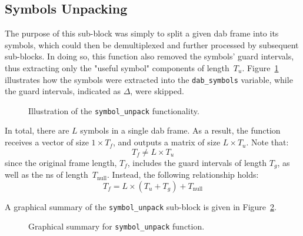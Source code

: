 \documentclass[class=report,11pt,crop=false]{standalone}
\begin{document}
\subsection{Symbols Unpacking \label{subsect:dab-proc_symbols-unpack}}
The purpose of this sub-block was simply to split a given \gls{dab} frame into its symbols, which could then be demultiplexed and further processed by subsequent sub-blocks. In doing so, this function also removed the symbols' guard intervals, thus extracting only the "useful symbol" components of length~\(T_u\). Figure~\ref{fig:symbols_unpack_illustration} illustrates how the symbols were extracted into the \texttt{dab\_symbols} variable, while the guard intervals, indicated as \(\Delta\), were skipped.

\begin{figure}[htbp]
  \centering
  \captionsetup{type=figure}
  \def\svgwidth{\linewidth}
  { %
    \scriptsize
      }
  \caption{Illustration of the \texttt{symbol\_unpack} functionality.}
  \label{fig:symbols_unpack_illustration}
\end{figure}

In total, there are \(L\) symbols in a single \gls{dab} frame. As a result, the function receives a vector of size \(1\times T_f\), and outputs a matrix of size \(L\times T_u\). Note that:
\begin{equation}
  T_f \ne L\times T_u
\end{equation}
since the original frame length, \(T_f\), includes the guard intervals of length \(T_g\), as well as the \gls{ns} of length~\(T_\mathrm{null}\). Instead, the following relationship holds:
\begin{equation}
  T_f = L\times (T_u + T_g) + T_\mathrm{null}
\end{equation}

A graphical summary of the \texttt{symbol\_unpack} sub-block is given in Figure~\ref{fig:symbols_unpack}.

\begin{figure}[htbp]
  \centering
  \captionsetup{type=figure}
  \def\svgwidth{\linewidth}
  { %
      }
  \caption{Graphical summary for \texttt{symbol\_unpack} function.}
  \label{fig:symbols_unpack}
\end{figure}

\end{document}
